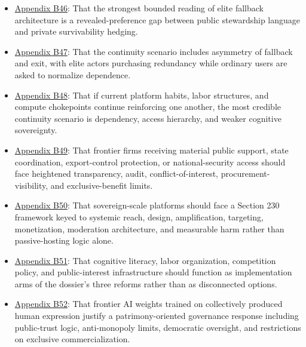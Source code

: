 \documentclass[
  american,
  11pt,
  letterpaper,
]{article}
\begin{document}
\begin{itemize}
  not only by boards, policy essays, and lobbying, but by operational
  state interfaces that normalize privileged access and public-private
  dependence.
\item
  \hyperref[appendix-b46-the-strongest-bounded-reading-of-elite-fallback-architecture-is-a-revealed-prefer]{Appendix
  B46}: That the strongest bounded reading of elite fallback
  architecture is a revealed-preference gap between public stewardship
  language and private survivability hedging.
\item
  \hyperref[appendix-b47-the-continuity-scenario-includes-asymmetry-of-fallback-and-exit-with-elite-actor]{Appendix
  B47}: That the continuity scenario includes asymmetry of fallback and
  exit, with elite actors purchasing redundancy while ordinary users are
  asked to normalize dependence.
\item
  \hyperref[appendix-b48-if-current-platform-habits-labor-structures-and-compute-chokepoints-continue-re]{Appendix
  B48}: That if current platform habits, labor structures, and compute
  chokepoints continue reinforcing one another, the most credible
  continuity scenario is dependency, access hierarchy, and weaker
  cognitive sovereignty.
\item
  \hyperref[appendix-b49-frontier-firms-receiving-material-public-support-state-coordination-export-cont]{Appendix
  B49}: That frontier firms receiving material public support, state
  coordination, export-control protection, or national-security access
  should face heightened transparency, audit, conflict-of-interest,
  procurement-visibility, and exclusive-benefit limits.
\item
  \hyperref[appendix-b50-sovereign-scale-platforms-should-face-a-section-230-framework-keyed-to-systemic-r]{Appendix
  B50}: That sovereign-scale platforms should face a Section 230
  framework keyed to systemic reach, design, amplification, targeting,
  monetization, moderation architecture, and measurable harm rather than
  passive-hosting logic alone.
\item
  \hyperref[appendix-b51-cognitive-literacy-labor-organization-competition-policy-and-public-interest-i]{Appendix
  B51}: That cognitive literacy, labor organization, competition policy,
  and public-interest infrastructure should function as implementation
  arms of the dossier's three reforms rather than as disconnected
  options.
\item
  \hyperref[appendix-b52-frontier-ai-weights-trained-on-collectively-produced-human-expression-justify-a-p]{Appendix
  B52}: That frontier AI weights trained on collectively produced human
  expression justify a patrimony-oriented governance response including
  public-trust logic, anti-monopoly limits, democratic oversight, and
  restrictions on exclusive commercialization.
\end{itemize}
\end{document}
